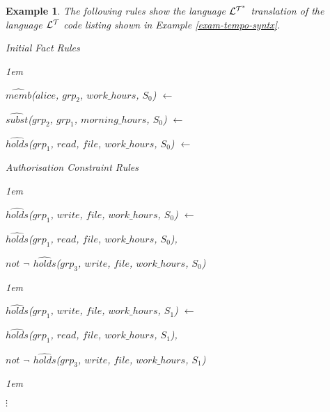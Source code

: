 \documentclass[11pt]{report}
\newtheorem{vexample}{Example}[chapter]
\newenvironment{vquote}
{
  \begin{list}{}{\leftmargin 1em}\item[]
}
{
  \end{list}
}
\begin{document}
        \begin{vexample}
          \label{exam-tempo-seman}
          The following rules show the language ${\cal L^{T^*}}$ translation
          of the language ${\cal L^T}$ code listing shown in Example
          \ref{exam-tempo-syntx}.

          \begin{enumerate}
            \item
              Initial Fact Rules

              \begin{vquote}
  $\hat{memb}$($alice$, $grp_2$, $work\_hours$, $S_0$) $\leftarrow$

  $\hat{subst}$($grp_2$, $grp_1$, $morning\_hours$, $S_0$) $\leftarrow$

  $\hat{holds}$($grp_1$, $read$, $file$, $work\_hours$, $S_0$) $\leftarrow$
              \end{vquote}

            \item
              Authorisation Constraint Rules

              \begin{vquote}
                $\hat{holds}$($grp_1$, $write$, $file$, $work\_hours$, $S_0$) $\leftarrow$

                \hspace{1em}
                $\hat{holds}$($grp_1$, $read$, $file$, $work\_hours$, $S_0$),

                \hspace{1em}
                $not$ $\lnot$ $\hat{holds}$($grp_3$, $write$, $file$, $work\_hours$, $S_0$)
              \end{vquote}

              \begin{vquote}
                $\hat{holds}$($grp_1$, $write$, $file$, $work\_hours$, $S_1$) $\leftarrow$

                \hspace{1em}
                $\hat{holds}$($grp_1$, $read$, $file$, $work\_hours$, $S_1$),

                \hspace{1em}
                $not$ $\lnot$ $\hat{holds}$($grp_3$, $write$, $file$, $work\_hours$, $S_1$)
              \end{vquote}

              \begin{vquote}
                \hspace{1em}
                $\vdots$
              \end{vquote}


\end{enumerate}
\end{vexample}
\end{document}
